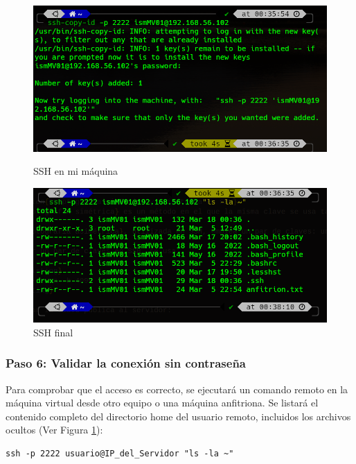 \begin{figure}[H]
  \centering
  \begin{minipage}[b]{0.45\textwidth}
    \centering
    \includegraphics[width=\textwidth]{images/copiaLlave.png}
    \caption{SSH en mi máquina}
    \label{copiaLlave}
  \end{minipage}
  \hfill
  \begin{minipage}[b]{0.45\textwidth}
    \centering
    \includegraphics[width=\textwidth]{images/finalSSH.png}
    \caption{SSH final}
    \label{finalSSH}
  \end{minipage}
\end{figure}

\subsubsection*{Paso 6: Validar la conexión sin contraseña}

Para comprobar que el acceso es correcto, se ejecutará un comando remoto en la máquina virtual desde otro equipo o una máquina anfitriona. Se listará el contenido completo del directorio home del usuario remoto, incluidos los archivos ocultos (Ver Figura \ref{finalSSH}):

\begin{lstlisting}[style=mystyle]
ssh -p 2222 usuario@IP_del_Servidor "ls -la ~"
\end{lstlisting}

